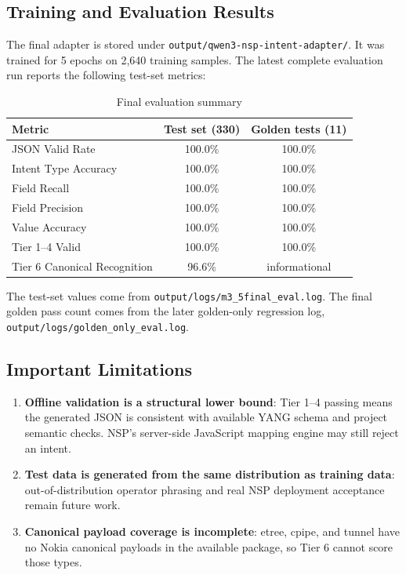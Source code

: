 \documentclass[12pt, a4paper]{article}
\newcommand{\filepath}[1]{\texttt{#1}}
\newcommand{\yang}{\textsc{YANG}}
\begin{document}
\subsection{Training and Evaluation Results}

The final adapter is stored under \filepath{output/qwen3-nsp-intent-adapter/}. It was trained for 5 epochs on 2,640 training samples. The latest complete evaluation run reports the following test-set metrics:

\begin{table}[H]
\centering
\caption{Final evaluation summary}
\small
\begin{tabular}{lcc}
\toprule
\textbf{Metric} & \textbf{Test set (330)} & \textbf{Golden tests (11)} \\
\midrule
JSON Valid Rate & 100.0\% & 100.0\% \\
Intent Type Accuracy & 100.0\% & 100.0\% \\
Field Recall & 100.0\% & 100.0\% \\
Field Precision & 100.0\% & 100.0\% \\
Value Accuracy & 100.0\% & 100.0\% \\
Tier 1--4 Valid & 100.0\% & 100.0\% \\
Tier 6 Canonical Recognition & 96.6\% & informational \\
\bottomrule
\end{tabular}
\end{table}

\noindent
The test-set values come from \filepath{output/logs/m3\_5final\_eval.log}. The final golden pass count comes from the later golden-only regression log, \filepath{output/logs/golden\_only\_eval.log}.

\subsection{Important Limitations}

\begin{enumerate}
  \item \textbf{Offline validation is a structural lower bound}: Tier 1--4 passing means the generated JSON is consistent with available \yang{} schema and project semantic checks. NSP's server-side JavaScript mapping engine may still reject an intent.
  \item \textbf{Test data is generated from the same distribution as training data}: out-of-distribution operator phrasing and real NSP deployment acceptance remain future work.
  \item \textbf{Canonical payload coverage is incomplete}: etree, cpipe, and tunnel have no Nokia canonical payloads in the available package, so Tier 6 cannot score those types.
\end{enumerate}
\end{document}
